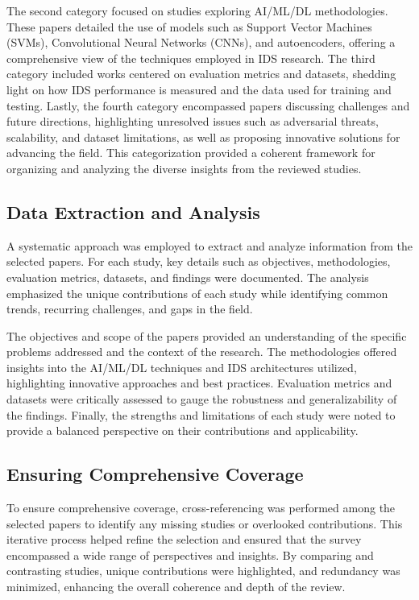 The second category focused on studies exploring AI/ML/DL methodologies. These papers detailed the use of models such as Support Vector Machines (SVMs), Convolutional Neural Networks (CNNs), and autoencoders, offering a comprehensive view of the techniques employed in IDS research. The third category included works centered on evaluation metrics and datasets, shedding light on how IDS performance is measured and the data used for training and testing. Lastly, the fourth category encompassed papers discussing challenges and future directions, highlighting unresolved issues such as adversarial threats, scalability, and dataset limitations, as well as proposing innovative solutions for advancing the field. This categorization provided a coherent framework for organizing and analyzing the diverse insights from the reviewed studies.




\subsection{Data Extraction and Analysis}
A systematic approach was employed to extract and analyze information from the selected papers. For each study, key details such as objectives, methodologies, evaluation metrics, datasets, and findings were documented. The analysis emphasized the unique contributions of each study while identifying common trends, recurring challenges, and gaps in the field.

The objectives and scope of the papers provided an understanding of the specific problems addressed and the context of the research. The methodologies offered insights into the AI/ML/DL techniques and IDS architectures utilized, highlighting innovative approaches and best practices. Evaluation metrics and datasets were critically assessed to gauge the robustness and generalizability of the findings. Finally, the strengths and limitations of each study were noted to provide a balanced perspective on their contributions and applicability.




\subsection{Ensuring Comprehensive Coverage}
To ensure comprehensive coverage, cross-referencing was performed among the selected papers to identify any missing studies or overlooked contributions. This iterative process helped refine the selection and ensured that the survey encompassed a wide range of perspectives and insights. By comparing and contrasting studies, unique contributions were highlighted, and redundancy was minimized, enhancing the overall coherence and depth of the review.




